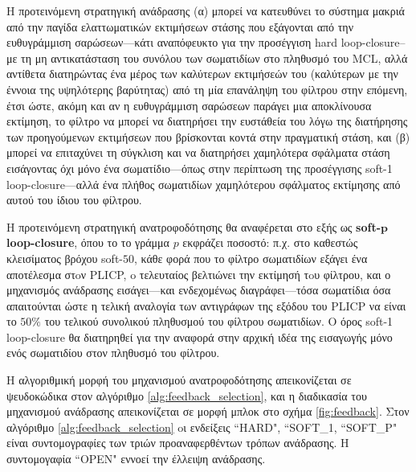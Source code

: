 Η προτεινόμενη στρατηγική ανάδρασης (α) μπορεί να κατευθύνει το σύστημα μακριά
από την παγίδα ελαττωματικών εκτιμήσεων στάσης που εξάγονται από την
ευθυγράμμιση σαρώσεων---κάτι αναπόφευκτο για την προσέγγιση hard
loop-closure--με τη μη αντικατάσταση του συνόλου των σωματιδίων στο πληθυσμό
του MCL, αλλά αντίθετα διατηρώντας ένα μέρος των καλύτερων εκτιμήσεών του
(καλύτερων με την έννοια της υψηλότερης βαρύτητας) από τη μία επανάληψη του
φίλτρου στην επόμενη, έτσι ώστε, ακόμη και αν η ευθυγράμμιση σαρώσεων παράγει
μια αποκλίνουσα εκτίμηση, το φίλτρο να μπορεί να διατηρήσει την ευστάθεία του
λόγω της διατήρησης των προηγούμενων εκτιμήσεων που βρίσκονται κοντά στην
πραγματική στάση, και (β) μπορεί να επιταχύνει τη σύγκλιση και να διατηρήσει
χαμηλότερα σφάλματα στάση εισάγοντας όχι μόνο ένα σωματίδιο---όπως στην
περίπτωση της προσέγγισης soft-1 loop-closure---αλλά ένα πλήθος σωματιδίων
χαμηλότερου σφάλματος εκτίμησης από αυτού του ίδιου του φίλτρου.

Η προτεινόμενη στρατηγική ανατροφοδότησης θα αναφέρεται στο εξής ως
\textbf{soft-}$\bm{p}$ \textbf{loop-closure}, όπου το το γράμμα $p$ εκφράζει
ποσοστό: π.χ. στο καθεστώς κλεισίματος βρόχου soft-$50$, κάθε φορά που το
φίλτρο σωματιδίων εξάγει ένα αποτέλεσμα στoν PLICP, o τελευταίος βελτιώνει την
εκτίμησή τoυ φίλτρου, και ο μηχανισμός ανάδρασης εισάγει---και ενδεχομένως
διαγράφει---τόσα σωματίδια όσα απαιτούνται ώστε η τελική αναλογία των
αντιγράφων της εξόδου του PLICP να είναι το $50\%$ του τελικού συνολικού
πληθυσμού του φίλτρου σωματιδίων. Ο όρος soft-1 loop-closure θα διατηρηθεί για
την αναφορά στην αρχική ιδέα της εισαγωγής μόνο ενός σωματιδίου στον πληθυσμό
του φίλτρου.

Η αλγοριθμική μορφή του μηχανισμού ανατροφοδότησης απεικονίζεται σε ψευδοκώδικα
στον αλγόριθμο \ref{alg:feedback_selection}, και η διαδικασία του μηχανισμού
ανάδρασης απεικονίζεται σε μορφή μπλοκ στο σχήμα \ref{fig:feedback}.  Στον
αλγόριθμο \ref{alg:feedback_selection} oι ενδείξεις ``HARD", ``SOFT\_1,
``SOFT\_P" είναι συντομογραφίες των τριών προαναφερθέντων τρόπων ανάδρασης. Η
συντομογαφία ``OPEN" εννοεί την έλλειψη ανάδρασης.


